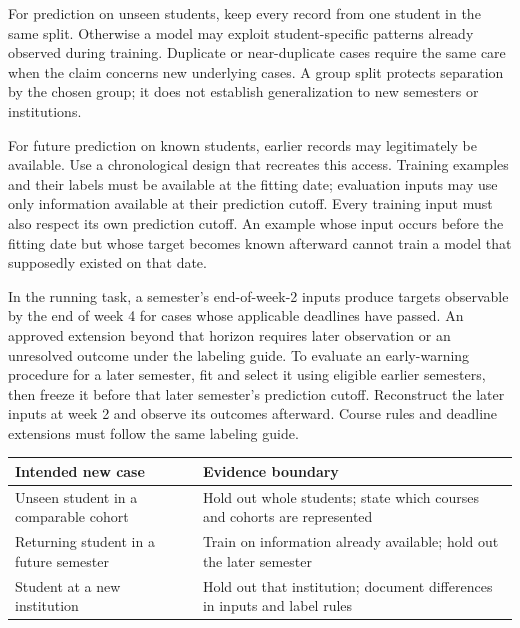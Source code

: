 For prediction on unseen students, keep every record from one student in the same split. Otherwise a model may exploit student-specific patterns already observed during training. Duplicate or near-duplicate cases require the same care when the claim concerns new underlying cases. A group split protects separation by the chosen group; it does not establish generalization to new semesters or institutions.

For future prediction on known students, earlier records may legitimately be available. Use a chronological design that recreates this access. Training examples and their labels must be available at the fitting date; evaluation inputs may use only information available at their prediction cutoff. Every training input must also respect its own prediction cutoff. An example whose input occurs before the fitting date but whose target becomes known afterward cannot train a model that supposedly existed on that date.

In the running task, a semester's end-of-week-2 inputs produce targets observable by the end of week 4 for cases whose applicable deadlines have passed. An approved extension beyond that horizon requires later observation or an unresolved outcome under the labeling guide. To evaluate an early-warning procedure for a later semester, fit and select it using eligible earlier semesters, then freeze it before that later semester's prediction cutoff. Reconstruct the later inputs at week 2 and observe its outcomes afterward. Course rules and deadline extensions must follow the same labeling guide.

\par\addvspace{\intextsep}\noindent\begin{minipage}{\linewidth}
\centering\small
\begin{tabular}{@{}L{3.65cm}L{6.55cm}@{}}
\toprule
Intended new case & Evidence boundary \\
\midrule
Unseen student in a comparable cohort & Hold out whole students; state which courses and cohorts are represented \\
Returning student in a future semester & Train on information already available; hold out the later semester \\
Student at a new institution & Hold out that institution; document differences in inputs and label rules \\
\bottomrule
\end{tabular}
\label{tab:evaluation-population-boundaries}
\end{minipage}\par\addvspace{\intextsep}

